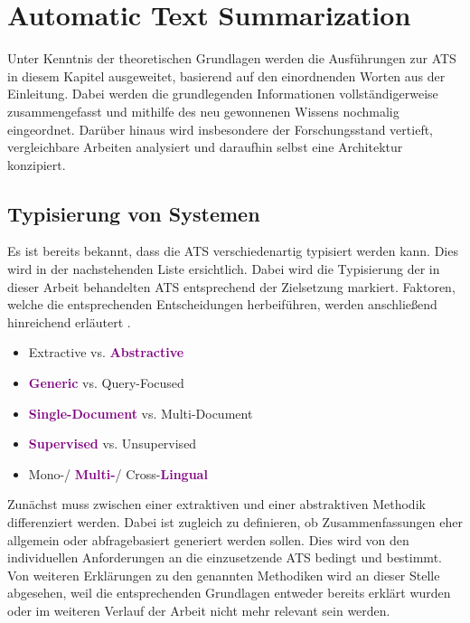 \chapter{Automatic Text Summarization}
\thispagestyle{fancy}
\label{chap:Automatic Text Summarization}

\noindent
Unter Kenntnis der theoretischen Grundlagen werden die Ausführungen zur \ac{ATS} in diesem Kapitel ausgeweitet, basierend auf den einordnenden Worten aus der Einleitung. Dabei werden die grundlegenden Informationen vollständigerweise zusammengefasst und mithilfe des neu gewonnenen Wissens nochmalig eingeordnet. Darüber hinaus wird insbesondere der Forschungsstand vertieft, vergleichbare Arbeiten analysiert und daraufhin selbst eine Architektur konzipiert.\\


\section{Typisierung von Systemen}
\noindent
Es ist bereits bekannt, dass die \ac{ATS} verschiedenartig typisiert werden kann. Dies wird in der nachstehenden Liste ersichtlich. Dabei wird die Typisierung der in dieser Arbeit behandelten \ac{ATS} entsprechend der Zielsetzung markiert. Faktoren, welche die entsprechenden Entscheidungen herbeiführen, werden anschließend hinreichend erläutert \cite[S.~5]{GAM16}.

\begin{itemize}
	\item Extractive vs. \textbf{\textcolor{purple}{Abstractive}}
	\item \textbf{\textcolor{purple}{Generic}} vs. Query-Focused
	\item \textbf{\textcolor{purple}{Single-Document}} vs. Multi-Document
	\item \textbf{\textcolor{purple}{Supervised}} vs. Unsupervised
	\item Mono-/ \textbf{\textcolor{purple}{Multi-}}/ Cross-\textbf{\textcolor{purple}{Lingual}}
\end{itemize}

\noindent
Zunächst muss zwischen einer extraktiven und einer abstraktiven Methodik differenziert werden. Dabei ist zugleich zu definieren, ob Zusammenfassungen eher allgemein oder abfragebasiert generiert werden sollen. Dies wird von den individuellen Anforderungen an die einzusetzende \ac{ATS} bedingt und bestimmt. Von weiteren Erklärungen zu den genannten Methodiken wird an dieser Stelle abgesehen, weil die entsprechenden Grundlagen entweder bereits erklärt wurden oder im weiteren Verlauf der Arbeit nicht mehr relevant sein werden.
\newpage

